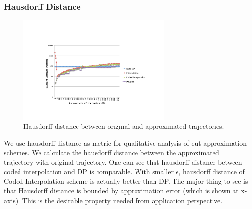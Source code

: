 \documentclass[conference]{IEEEtran}
\begin{document}
\subsubsection{Hausdorff Distance}
\begin{figure}[h]
  \centering
  \includegraphics[width=3in]{images/hausdorff-distance.pdf}
  \caption {Hausdorff distance between original and approximated trajectories.}
  \label{fig:hausdorff-distance}
  \end{figure}
We use hausdorff distance as metric for qualitative analysis of out approximation schemes. We calculate the hausdorff distance between the approximated trajectory with original trajectory. One can see that hausdorff distance between coded interpolation and DP is comparable. With smaller $\epsilon$, hausdorff distance of Coded Interpolation scheme is actually better than DP. The major thing to see is that Hausdorff distance is bounded by approximation error (which is shown at x-axis). This is the desirable property needed from application perspective.
\end{document}
